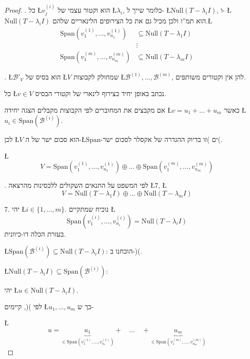 \documentclass[english,hebrew]{article}
\begin{document}
\begin{proof}
{\endL}. כל \L{$v_{j}^{(i)}$} הוא וקטור עצמי של \L{$\lambda_{i}$},
כלומר שייך ל- \L{$\text{Null}(T-\lambda_{i}I)$}, ו- \L{$\text{Null}(T-\lambda_{i}I)$}
הוא תמ\textquotedblright ו ולכן מכיל גם את כל הצירופים הלינאריים שלהם.\L{%
\begin{align*}
\text{Span}\left(v_{1}^{(1)},\dots,v_{n_{1}}^{(1)}\right) & \subseteq\text{Null}(T-\lambda_{1}I)\\
 & \vdots\\
\text{Span}\left(v_{1}^{(m)},\dots,v_{n_{m}}^{(m)}\right) & \subseteq\text{Null}(T-\lambda_{m}I)
\end{align*}
}%

{\endL}. \L{$\mathcal{B}'_{V}$} הוא בסיס של \L{$V$} שמחולק
לקבוצות \L{$\mathcal{B}^{(1)},\dots,\mathcal{B}^{(m)}$}, להן אין
וקטורים משותפים.

כל \L{$v\in V$} נכתב באופן יחיד כצירוף לינארי של וקטורי הבסיס.

אם מקבצים את המחוברים לפי הקבוצות מקבלים הצגה יחידה \L{$v=u_{1}+\dots+u_{m}$}
כאשר \L{$u_{i}\in\text{Span}\left(\mathcal{B}^{(i)}\right)$}.

לכן \L{$V$} הוא סכום ישר של ה-\L{$\text{Span}$}-ים )זו בדיוק ההגדרה
של אקסלר לסכום ישר(.

\L{%
\[
V=\text{Span}\left(v_{1}^{(1)},\dots,v_{n_{1}}^{(1)}\right)\oplus\dots\oplus\text{Span}\left(v_{1}^{(m)},\dots,v_{n_{m}}^{(m)}\right)
\]
}%

{\endL}. לפי המשפט על התנאים השקולים ללכסינות מהרצאה \L{$7$},
\L{%
\[
V=\text{Null}(T-\lambda_{1}I)\oplus\dots\oplus\text{Null}(T-\lambda_{m}I)
\]
}%

7. יהי \L{$i\in\{1,\dots,m\}$}. נוכיח שמתקיים \L{%
\[
\text{Span}\left(v_{1}^{(i)},\dots,v_{n_{i}}^{(i)}\right)=\text{Null}(T-\lambda_{i}I)
\]
}%
בעזרת הכלה דו-כיוונית.

\L{$\text{Span}\left(\mathcal{B}^{(i)}\right)\subseteq\text{Null}(T-\lambda_{i}I)$}:
הוכחנו ב-){\endL}(.

\L{$\text{Null}(T-\lambda_{i}I)\subseteq\text{Span}\left(\mathcal{B}^{(i)}\right)$}:

יהי \L{$u\in\text{Null}(T-\lambda_{i}I)$}.

לפי ){\endL}(, קיימים \L{$u_{1},\dots,u_{m}$} כך ש-

\L{%
\[
u=\underset{\in\text{Span}\left(v_{1}^{(1)},\dots,v_{n_{1}}^{(1)}\right)}{\underbrace{u_{1}}}+\quad\dots\quad+\underset{\in\text{Span}\left(v_{1}^{(m)},\dots,v_{n_{m}}^{(m)}\right)}{\underbrace{u_{m}}}
\]
}%


\end{proof}
\end{document}
